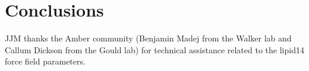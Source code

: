 \documentclass[aps,prl,superscriptaddress,twocolumn]{revtex4}
\begin{document}
\section{Conclusions}




%

\begin{acknowledgments}
JJM thanks the Amber community (Benjamin Madej from the Walker lab and Callum Dickson from the Gould lab) for technical assistance related to the lipid14 force field parameters.
\end{acknowledgments}




\listoftodos
\end{document}
